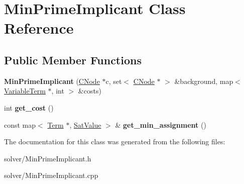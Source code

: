 \hypertarget{classMinPrimeImplicant}{\section{\-Min\-Prime\-Implicant \-Class \-Reference}
\label{classMinPrimeImplicant}
}
\subsection*{\-Public \-Member \-Functions}
\begin{DoxyCompactItemize}
\item 
\hypertarget{classMinPrimeImplicant_ab3e936e1a5035c86e04dd7a29c7df3e1}{{\bfseries \-Min\-Prime\-Implicant} (\hyperlink{classCNode}{\-C\-Node} $\ast$c, set$<$ \hyperlink{classCNode}{\-C\-Node} $\ast$ $>$ \&background, map$<$ \hyperlink{classVariableTerm}{\-Variable\-Term} $\ast$, int $>$ \&costs)}\label{classMinPrimeImplicant_ab3e936e1a5035c86e04dd7a29c7df3e1}

\item 
\hypertarget{classMinPrimeImplicant_a1a61691e86ca0506d6aad66e4867a267}{int {\bfseries get\-\_\-cost} ()}\label{classMinPrimeImplicant_a1a61691e86ca0506d6aad66e4867a267}

\item 
\hypertarget{classMinPrimeImplicant_ab99cc014b2df3c1867a88e4f133b0a14}{const map$<$ \hyperlink{classTerm}{\-Term} $\ast$, \hyperlink{classSatValue}{\-Sat\-Value} $>$ \& {\bfseries get\-\_\-min\-\_\-assignment} ()}\label{classMinPrimeImplicant_ab99cc014b2df3c1867a88e4f133b0a14}

\end{DoxyCompactItemize}


\-The documentation for this class was generated from the following files\-:\begin{DoxyCompactItemize}
\item 
solver/\-Min\-Prime\-Implicant.\-h\item 
solver/\-Min\-Prime\-Implicant.\-cpp\end{DoxyCompactItemize}
